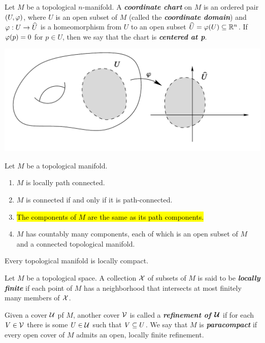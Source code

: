 \dfn Let $M$ be a topological $n$-manifold. A \textbf{\textit{coordinate chart}} on $M$ is an ordered pair $(U, \varphi)$, where $U$ is an open subset of $M$ (called the \textbf{\textit{coordinate domain}}) and $\varphi:U\rightarrow \widehat U$ is a homeomorphism from $U$ to an open subset $\widehat U = \varphi(U) \subseteq \mathbb{R}^n$. If $\varphi(p) = 0$ for $p\in U$, then we say that the chart is \textbf{\textit{centered at p}}.

\begin{center}
    \includegraphics[scale = 0.4]{chapter01/c1f2.png}
\end{center}

\setcounter{thm}{10}

\begin{prop}
Let $M$ be a topological manifold. 
\begin{enumerate}
    \item $M$ is locally path connected.
    \item $M$ is connected if and only if it is path-connected.
    \item \hl{The components of $M$ are the same as its path components.}
    \item $M$ has countably many components, each of which is an open subset of $M$ and a connected topological manifold.
\end{enumerate}
\end{prop}

\begin{prop}
Every topological manifold is locally compact.
\end{prop}

\dfn Let $M$ be a topological space. A collection $\mathcal{X}$ of subsets of $M$ is said to be \textbf{\textit{locally finite}} if each point of $M$ has a neighborhood that intersects at most finitely many members of $\mathcal{X}$. 

\dfn Given a cover $\mathcal{U}$ pf $M$, another cover $\mathcal{V}$ is called a \textbf{\textit{refinement of $\boldsymbol{\mathcal{U}}$}} if for each $V\in \mathcal{V}$ there is some $U\in \mathcal{U}$ such that $V\subseteq U$. We say that $M$ is \textbf{\textit{paracompact}} if every open cover of $M$ admits an open, locally finite refinement.

